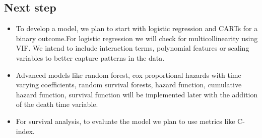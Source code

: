 \documentclass[
]{article}
\begin{document}
\subsection{Next step}\label{next-step}

\begin{itemize}
\item
  To develop a model, we plan to start with logistic regression and
  CARTs for a binary outcome.For logistic regression we will check for
  multicollinearity using VIF. We intend to include interaction terms,
  polynomial features or scaling variables to better capture patterns in
  the data.
\item
  Advanced models like random forest, cox proportional hazards with time
  varying coefficients, random survival forests, hazard function,
  cumulative hazard function, survival function will be implemented
  later with the addition of the death time variable.
\item
  For survival analysis, to evaluate the model we plan to use metrics
  like C-index.
\end{itemize}
\end{document}
